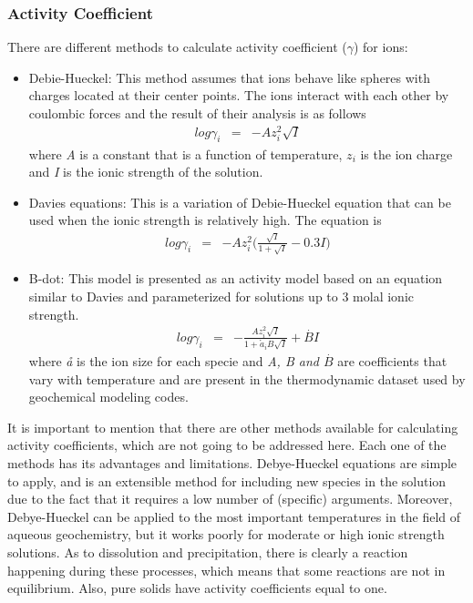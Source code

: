 \subsubsection{Activity Coefficient} \label{actCoeff}
There are different methods to calculate activity coefficient ($\gamma$) for ions:
\begin{itemize}
\item Debie-Hueckel: This method assumes that ions behave like spheres with charges located at their center points. The ions interact with each other by coulombic forces and the result of their analysis is as follows
\begin{eqnarray} \label{eq:debyeEq}
log \gamma_i &=& - Az_i^2\sqrt{I}
\end{eqnarray} 
where \emph{A} is a constant that is a function of temperature, \emph{$z_i$} is the ion charge and \emph{I} is the ionic strength of the solution.
\item Davies equations: This is a variation of Debie-Hueckel equation that can be used when the ionic strength is relatively high. The equation is
\begin{eqnarray} \label{eq:daviesEq}
log \gamma_i &=& - Az_i^2 \bigg(\frac{\sqrt{I}}{1+\sqrt{I}} - 0.3 I)
\end{eqnarray}
\item B-dot: This model is presented as an activity model based on an equation similar to Davies and parameterized for solutions up to 3 molal ionic strength.
\begin{eqnarray} \label{eq:bdotEq}
log \gamma_i &=& - \frac{Az_i^2 \sqrt{I}}{1+ \mathring{a}_i B \sqrt{I}} + \overset{.}{B} I 
\end{eqnarray}
where \emph{\aa}  is the ion size for each specie and \emph{A, B and $\overset{.}{B}$} are coefficients that vary with temperature and are present in the thermodynamic dataset used by geochemical modeling codes.
\end{itemize}
It is important to mention that there are other methods available for calculating activity coefficients, which are not going to be addressed here. Each one of the methods has its advantages and limitations. Debye-Hueckel equations are simple to apply, and is an extensible method for including new species in the solution due to the fact that it requires a low number of (specific) arguments. Moreover, Debye-Hueckel can be applied to the most important temperatures in the field of aqueous geochemistry, but it works poorly for moderate or high ionic strength solutions.
As to dissolution and precipitation, there is clearly a reaction happening during these processes, which means that some reactions are not in equilibrium. Also, pure solids have activity coefficients equal to one.

